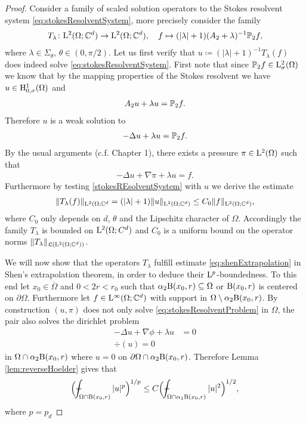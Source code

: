 \begin{proof}
  Consider a family of scaled solution operators to the Stokes resolvent system \eqref{eq:stokesResolventSystem}, more precisely consider the family
  \begin{align*}
    T_\lambda \colon \mathrm{L}^2(\Omega; \mathbb{C}^d) \to \mathrm{L}^2(\Omega; \mathbb{C}^d), \quad f \mapsto (|\lambda| + 1) (A_2 + \lambda)^{-1} \mathbb{P}_2 f,
  \end{align*}
  where $\lambda \in \Sigma_\theta$, $\theta \in (0, \pi/2)$.
  Let us first verify that $u \coloneqq (|\lambda| + 1)^{-1} T_\lambda(f)$ does indeed solve \eqref{eq:stokesResolventSystem}.
  First note that since $\mathbb{P}_2 f \in \mathrm{L}^2_\sigma(\Omega)$ we know that by the mapping properties of the Stokes resolvent we have $u \in \mathrm{H}^1_{0,\sigma}(\Omega)$ and
  \begin{align*}
    A_2 u + \lambda u = \mathbb{P}_2 f.
  \end{align*}
  Therefore $u$ is a weak solution to 
  \begin{align*}
    -\Delta u + \lambda u = \mathbb{P}_2 f.
  \end{align*}
  By the usual arguments (c.f. Chapter 1), there exists a pressure $\pi \in \mathrm{L}^2(\Omega)$ such that 
  \begin{align*}
    -\Delta u + \nabla \pi + \lambda u = f.
  \end{align*}
  Furthermore by testing \eqref{stokesREsolventSystem} with $u$ we derive the estimate
  \begin{align*}
    \| T_\lambda(f) \|_{\mathrm{L}^2(\Omega; \mathbb{C}^d} = (|\lambda| + 1) \|u\|_{\mathrm{L}^2(\Omega; \mathbb{C}^d)}
    \leq C_0 \|f\|_{\mathrm{L}^2(\Omega; \mathbb{C}^d)},
  \end{align*}
  where $C_0$ only depends on $d$, $\theta$ and the Lipschitz character of $\Omega$.
  Accordingly the family $T_\lambda$ is bounded on $\mathrm{L}^2(\Omega; C^d)$ and $C_0$ is a uniform bound on the operator norms $\|T_\lambda\|_{\mathfrak{L}(\mathrm{L}^2(\Omega; \mathbb{C}^d))}$.

  We will now show that the operators $T_\lambda$ fulfill estimate \eqref{eq:shenExtrapolation} in Shen's extrapolation theorem, in order to deduce their $\mathrm{L}^p$-boundedness.
  To this end let $x_0 \in \overline \Omega$ and $0 < 2r < r_0$ such that $\alpha_2 \mathrm{B}(x_0, r) \subseteq \Omega$ or $\mathrm{B}(x_0, r)$ is centered on $\partial\Omega$.
  Furthermore let $f \in \mathrm{L}^\infty(\Omega; \mathbb{C}^d)$ with support in $\Omega \setminus \alpha_2 \mathrm{B}(x_0, r)$.
  By construction $(u,\pi)$ does not only solve \eqref{eq:stokesResolventProblem} in $\Omega$, the pair also solves the dirichlet problem
  \begin{align*}
    -\Delta u + \nabla \phi + \lambda u &= 0 \\
    \div(u) = 0
  \end{align*}
  in $\Omega \cap \alpha_2 \mathrm{B}(x_0, r)$ where $u = 0$ on $\partial\Omega \cap \alpha_2 \mathrm{B}(x_0, r)$.
  Therefore Lemma \ref{lem:reverseHoelder} gives that
  \begin{align*}
    \Big( \dashint_{\Omega \cap \BB(x_0, r)} |u|^p \Big)^{1/p} \leq C \Big( \dashint_{\Omega \cap \alpha_1 \BB(x_0, r)} |u|^2 \Big)^{1/2},
  \end{align*}
  where $p = p_d$ 



\end{proof}

